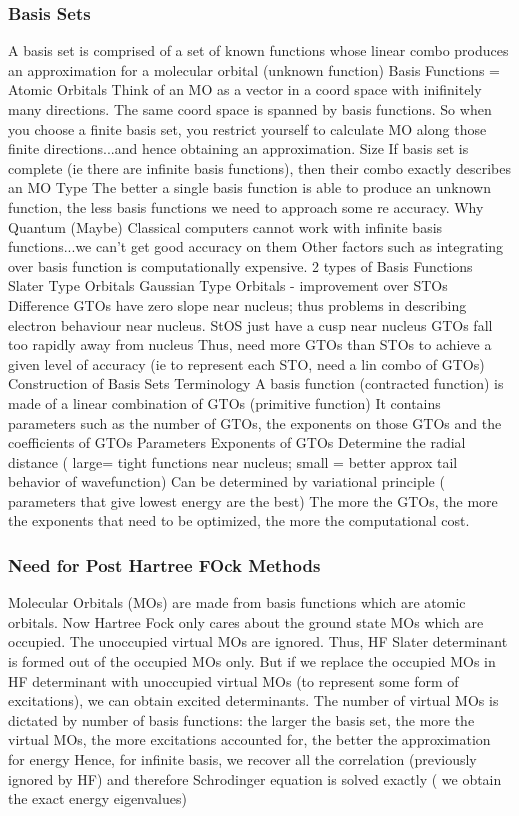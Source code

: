 \documentclass{article}
\begin{document}
\subsubsection{Basis Sets}
A basis set is comprised of a set of known functions whose linear combo produces an approximation for a molecular orbital (unknown function)
Basis Functions = Atomic Orbitals
Think of an MO as a vector in a coord space with inifinitely many directions. The same coord space is spanned by basis functions. So when you choose a finite basis set, you restrict yourself to calculate MO along those finite directions...and hence obtaining an approximation.
Size
If basis set is complete (ie there are infinite basis functions), then their combo exactly describes an MO
Type
The better a single basis function is able to produce an unknown function, the less basis functions we need to approach some re accuracy.
Why Quantum (Maybe)
Classical computers cannot work with infinite basis functions...we can’t get good accuracy on them
Other factors such as integrating over basis function is computationally expensive.
2 types of Basis Functions
Slater Type Orbitals
Gaussian Type Orbitals - improvement over STOs
Difference
GTOs have zero slope near nucleus; thus problems in describing electron behaviour near nucleus. StOS just have a cusp near nucleus
GTOs fall too rapidly away from nucleus
Thus, need more GTOs than STOs to achieve a given level of accuracy (ie to represent each STO, need a lin combo of GTOs)
Construction of Basis Sets
Terminology
A basis function (contracted function) is made of a linear combination of GTOs (primitive function)
It contains parameters such as the number of GTOs, the exponents on those GTOs and the coefficients of GTOs
Parameters
Exponents of GTOs
Determine the radial distance ( large= tight functions near nucleus; small = better approx tail behavior of wavefunction)
Can be determined by variational principle ( parameters that give lowest energy are the best)
The more the GTOs, the more the exponents that need to be optimized, the more the computational cost.

\subsubsection{Need for Post Hartree FOck Methods}
Molecular Orbitals (MOs) are made from basis functions which are atomic orbitals.
Now Hartree Fock only cares about the ground state MOs which are occupied. The unoccupied virtual MOs are ignored.
Thus, HF Slater determinant is formed out of the occupied MOs only.
But if we replace the occupied MOs in HF determinant with unoccupied virtual MOs (to represent some form of excitations), we can obtain excited determinants.
The number of virtual MOs is dictated by number of basis functions: the larger the basis set, the more the virtual MOs, the more excitations accounted for, the better the approximation for energy
Hence, for infinite basis, we recover all the correlation (previously ignored by HF) and therefore Schrodinger equation is solved exactly ( we obtain the exact energy eigenvalues)
\end{document}
